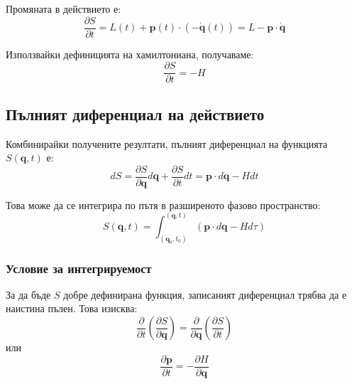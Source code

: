 \documentclass{report}
\begin{document}
Промяната в действието е:
\begin{equation}
\frac{\partial S}{\partial t} = L(t) + \mathbf{p}(t) \cdot (-\dot{\mathbf{q}}(t)) = L - \mathbf{p} \cdot \dot{\mathbf{q}}
\end{equation}


Използвайки дефиницията на хамилтониана, получаваме:
\begin{equation}
\frac{\partial S}{\partial t} = -H
\end{equation}



\subsection{Пълният диференциал на действието}
Комбинирайки получените резултати, пълният диференциал на функцията $S(\mathbf{q}, t)$ е:
\begin{equation}
dS = \frac{\partial S}{\partial \mathbf{q}} d\mathbf{q} + \frac{\partial S}{\partial t} dt = \mathbf{p} \cdot d\mathbf{q} - H dt
\end{equation}

Това може да се интегрира по пътя в разширеното фазово пространство:
\begin{equation}
S(\mathbf{q}, t) = \int_{(\mathbf{q}_0, t_0)}^{(\mathbf{q}, t)} (\mathbf{p} \cdot d\mathbf{q} - H d\tau)
\end{equation}

\subsubsection{Условие за интегрируемост}
За да бъде $S$ добре дефинирана функция, записаният диференциал трябва да е наистина пълен. Това изисква:
\begin{equation}
\frac{\partial}{\partial t}\left(\frac{\partial S}{\partial \mathbf{q}}\right) = \frac{\partial}{\partial \mathbf{q}}\left(\frac{\partial S}{\partial t}\right)
\end{equation}
или
\begin{equation}
\frac{\partial \mathbf{p}}{\partial t} = -\frac{\partial H}{\partial \mathbf{q}}
\end{equation}
\end{document}
